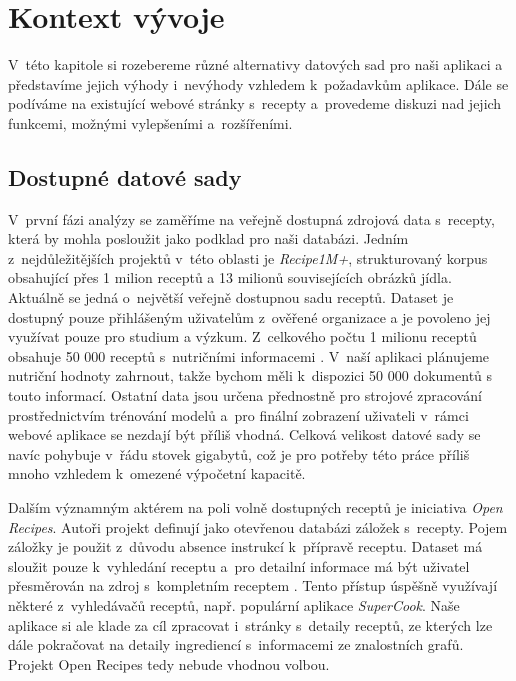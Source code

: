 
\chapter{Kontext vývoje}

V~této kapitole si rozebereme různé alternativy datových sad pro naši aplikaci a představíme jejich výhody i~nevýhody vzhledem k~požadavkům aplikace. Dále se podíváme na existující webové stránky s~recepty a~provedeme diskuzi nad jejich funkcemi, možnými vylepšeními a~rozšířeními.

\section{Dostupné datové sady}

V~první fázi analýzy se zaměříme na veřejně dostupná zdrojová data s~recepty, která by mohla posloužit jako podklad pro naši databázi. Jedním z~nejdůležitějších projektů v~této oblasti je \emph{Recipe1M+}, strukturovaný korpus obsahující přes 1 milion receptů a 13 milionů souvisejících obrázků jídla. Aktuálně se jedná o~největší veřejně dostupnou sadu receptů. Dataset je dostupný pouze přihlášeným uživatelům z~ověřené organizace a je povoleno jej využívat pouze pro studium a výzkum. Z~celkového počtu 1 milionu receptů obsahuje 50 000 receptů s~nutričními informacemi \citep{marin2019learning}. V~naší aplikaci plánujeme nutriční hodnoty zahrnout, takže bychom měli k~dispozici 50 000 dokumentů s touto informací. Ostatní data jsou určena přednostně pro strojové zpracování prostřednictvím trénování modelů a~pro finální zobrazení uživateli v~rámci webové aplikace se nezdají být příliš vhodná. Celková velikost datové sady se navíc pohybuje v~řádu stovek gigabytů, což je pro potřeby této práce příliš mnoho vzhledem k~omezené výpočetní kapacitě.

Dalším významným aktérem na poli volně dostupných receptů je iniciativa \emph{Open Recipes}. Autoři projekt definují jako otevřenou databázi záložek s~recepty. Pojem záložky je použit z~důvodu absence instrukcí k~přípravě receptu. Dataset má sloužit pouze k~vyhledání receptu a~pro detailní informace má být uživatel přesměrován na zdroj s~kompletním receptem \citep{open-recipes}. Tento přístup úspěšně využívají některé z~vyhledávačů receptů, např. populární aplikace \emph{SuperCook}. Naše aplikace si ale klade za cíl zpracovat i~stránky s~detaily receptů, ze kterých lze dále pokračovat na detaily ingrediencí s~informacemi ze znalostních grafů. Projekt Open Recipes tedy nebude vhodnou volbou.